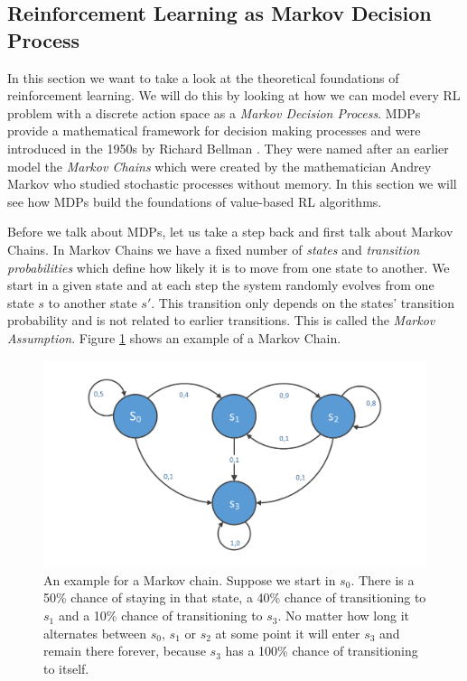 \subsection{Reinforcement Learning as Markov Decision Process} \label{ssec:RLMDP}
In this section we want to take a look at the theoretical foundations of reinforcement learning. We will do this by looking at how we can model every RL problem with a discrete action space as a \textit{Markov Decision Process}. MDPs provide a mathematical framework for decision making processes and were introduced in the 1950s by Richard Bellman \cite{bellman1957markovian}. They were named after an earlier model the \textit{Markov Chains} which were created by the mathematician Andrey Markov who studied stochastic processes without memory. In this section we will see how MDPs build the foundations of value-based RL algorithms.

Before we talk about MDPs, let us take a step back and first talk about Markov Chains. In Markov Chains we have a fixed number of \textit{states} and \textit{transition probabilities} which define how likely it is to move from one state to another. We start in a given state and at each step the system randomly evolves from one state $s$ to another state $s'$. This transition only depends on the states' transition probability and is not related to earlier transitions. This is called the \textit{Markov Assumption}. Figure \ref{fig:MarkovChain} shows an example of a Markov Chain.

\begin{figure}[ht]
  
  \begin{center}
      \includegraphics[trim=10px 10px 10px 10px, clip, width=0.8\columnwidth]{figures/rl/markov_chain.pdf}
  \end{center}
  
  \caption[An Markov Chain Example]{An example for a Markov chain. Suppose we start in $s_0$. There is a 50\% chance of staying in that state, a 40\% chance of transitioning to $s_1$ and a 10\% chance of transitioning to $s_3$. No matter how long it alternates between $s_0$, $s_1$ or $s_2$ at some point it will enter $s_3$ and remain there forever, because $s_3$ has a 100\% chance of transitioning to itself.}
  \label{fig:MarkovChain}
\end{figure}



